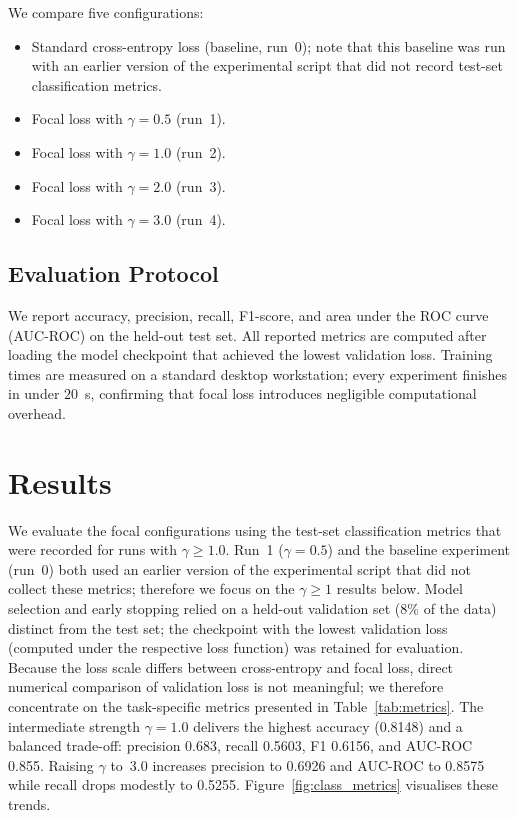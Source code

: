 \documentclass[11pt,a4paper]{article}
\begin{document}
We compare five configurations:
\begin{itemize}
    \item Standard cross-entropy loss (baseline, run~0); note that this baseline was run with an earlier version of the experimental script that did not record test-set classification metrics.
    \item Focal loss with $\gamma = 0.5$ (run~1).
    \item Focal loss with $\gamma = 1.0$ (run~2).
    \item Focal loss with $\gamma = 2.0$ (run~3).
    \item Focal loss with $\gamma = 3.0$ (run~4).
\end{itemize}

\subsection{Evaluation Protocol}
We report accuracy, precision, recall, F1-score, and area under the ROC curve (AUC-ROC) on the held-out test set. All reported metrics are computed after loading the model checkpoint that achieved the lowest validation loss. Training times are measured on a standard desktop workstation; every experiment finishes in under $20$~s, confirming that focal loss introduces negligible computational overhead.

\section{Results}
\label{sec:results}

We evaluate the focal configurations using the test-set classification metrics that were recorded for runs with $\gamma \ge 1.0$.  Run~1 ($\gamma=0.5$) and the baseline experiment (run~0) both used an earlier version of the experimental script that did not collect these metrics; therefore we focus on the $\gamma\ge1$ results below.  Model selection and early stopping relied on a held-out validation set (8\% of the data) distinct from the test set; the checkpoint with the lowest validation loss (computed under the respective loss function) was retained for evaluation.  Because the loss scale differs between cross-entropy and focal loss, direct numerical comparison of validation loss is not meaningful; we therefore concentrate on the task-specific metrics presented in Table~\ref{tab:metrics}.  The intermediate strength $\gamma=1.0$ delivers the highest accuracy (0.8148) and a balanced trade-off: precision 0.683, recall 0.5603, F1 0.6156, and AUC-ROC 0.855.  Raising $\gamma$ to~3.0 increases precision to 0.6926 and AUC-ROC to 0.8575 while recall drops modestly to 0.5255.  Figure~\ref{fig:class_metrics} visualises these trends.
\end{document}
